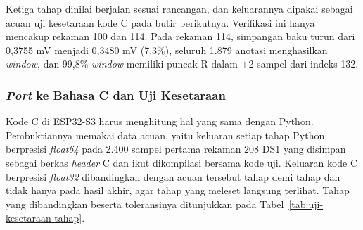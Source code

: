 Ketiga tahap dinilai berjalan sesuai rancangan, dan keluarannya dipakai sebagai acuan uji kesetaraan kode C pada butir berikutnya. Verifikasi ini hanya mencakup rekaman 100 dan 114. Pada rekaman 114, simpangan baku turun dari 0,3755 mV menjadi 0,3480 mV (7,3\%), seluruh 1.879 anotasi menghasilkan \textit{window}, dan 99,8\% \textit{window} memiliki puncak R dalam $\pm$2 sampel dari indeks 132.

\subsubsection{\textit{Port} ke Bahasa C dan Uji Kesetaraan}

Kode C di ESP32-S3 harus menghitung hal yang sama dengan Python. Pembuktiannya memakai data acuan, yaitu keluaran setiap tahap Python berpresisi \textit{float64} pada 2.400 sampel pertama rekaman 208 DS1 yang disimpan sebagai berkas \textit{header} C dan ikut dikompilasi bersama kode uji. Keluaran kode C berpresisi \textit{float32} dibandingkan dengan acuan tersebut tahap demi tahap dan tidak hanya pada hasil akhir, agar tahap yang meleset langsung terlihat. Tahap yang dibandingkan beserta toleransinya ditunjukkan pada Tabel~\ref{tab:uji-kesetaraan-tahap}.

